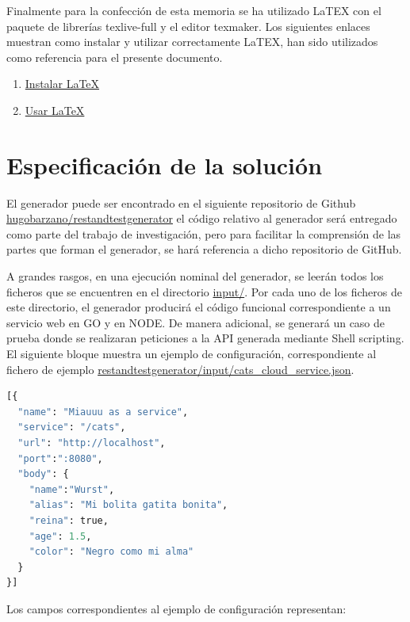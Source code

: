 \documentclass[a4paper,11pt]{book}
\begin{document}
Finalmente para la confección de esta memoria se ha utilizado LaTEX con el paquete de librerías texlive-full y el editor texmaker. Los siguientes enlaces muestran como instalar y utilizar correctamente LaTEX, han sido utilizados como referencia para el presente documento. 

\begin{enumerate}
\item \href{http://milq.github.io/install-latex-ubuntu-debian/}{Instalar LaTeX}
\item \href{ http://minisconlatex.blogspot.com.es/}{Usar LaTeX}
\end{enumerate}


\section{Especificación de la solución}

El generador puede ser encontrado en el siguiente repositorio de Github \href{ https://github.com/hugobarzano/restandtestgenerator}{hugobarzano/restandtestgenerator} el código relativo al generador será entregado como parte del trabajo de investigación, pero para facilitar la comprensión de las partes que forman el generador, se hará referencia a dicho repositorio de GitHub. 

A grandes rasgos, en una ejecución nominal del generador, se leerán todos los ficheros que se encuentren en el directorio  \href{https://github.com/hugobarzano/restandtestgenerator/tree/master/input}{input/}. Por cada uno de los ficheros de este directorio, el generador producirá el código funcional correspondiente a un servicio web en GO y en NODE. De manera adicional, se generará un caso de prueba donde se realizaran peticiones a la API generada mediante Shell scripting.  El siguiente bloque muestra un ejemplo de configuración, correspondiente al fichero de ejemplo  \href{https://github.com/hugobarzano/restandtestgenerator/blob/master/input/cats\_cloud\_service.json}{restandtestgenerator/input/cats\_cloud\_service.json}. 

\begin{lstlisting}[language=python,caption={ Ejemplo Entrada Generador }]
[{
  "name": "Miauuu as a service",
  "service": "/cats",
  "url": "http://localhost",
  "port":":8080",
  "body": {
    "name":"Wurst",
    "alias": "Mi bolita gatita bonita",
    "reina": true,
    "age": 1.5,
    "color": "Negro como mi alma"
  }
}]
\end{lstlisting}


Los campos correspondientes al ejemplo de configuración representan: 
\end{document}
